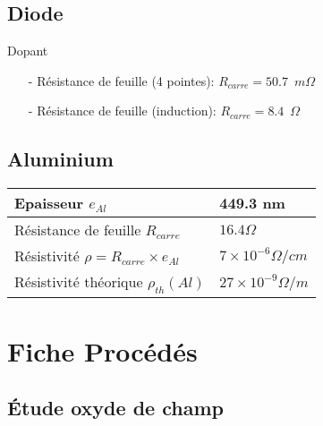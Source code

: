 \documentclass[11pt]{article}
\begin{document}
\subsection{Diode}

Dopant
\begin{itemize} \itemsep -2pt
\item[-] R\'esistance de feuille (4 pointes): $R_{carre} = 50.7 \phantom{2} m\Omega$
\item[-] R\'esistance de feuille (induction): $R_{carre} = 8.4 \phantom{2} \Omega$
\end{itemize}

\subsection{Aluminium}

	\begin{center}
    \noindent \begin{tabular}[!htb]{ | p{7cm} | p{7cm} | }
    \hline
    Epaisseur $e_{Al}$ & 449.3 nm \\ \hline
    R\'esistance de feuille $R_{carre}$ & $16.4 \Omega$ \\ \hline
    R\'esistivit\'e       $\rho = R_{carre} \times e_{Al}$ & $7 \times 10^{-6} \Omega/cm$ \\ \hline
    R\'esistivit\'e th\'eorique  $\rho_{th}(Al)$  & $27 \times 10^{-9} \Omega/m$ \\
    \hline
    \end{tabular}
    \end{center}

\section{Fiche Proc\'ed\'es}

\subsection{\'Etude oxyde de champ}
\end{document}
